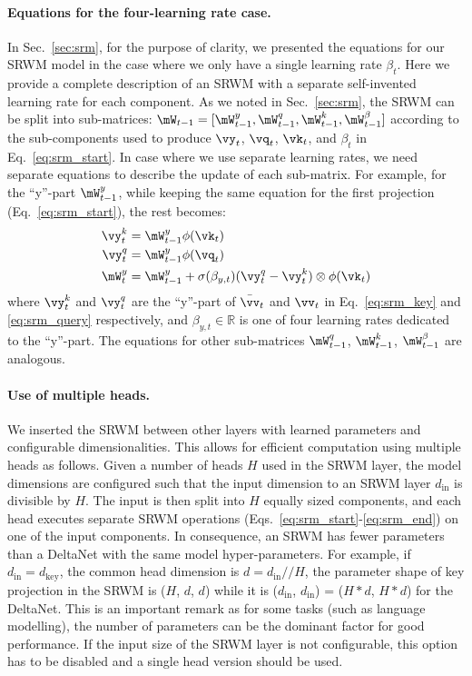 \documentclass[nohyperref]{article}
\theoremstyle{plain}
\theoremstyle{definition}
\theoremstyle{remark}
\begin{document}
\paragraph{Equations for the four-learning rate case.}
In Sec.~\ref{sec:srm}, for the purpose of clarity,
we presented the equations for our SRWM
model in the case where we only have a single learning rate $\beta_t$.
Here we provide a complete description of an SRWM with a separate self-invented learning rate for each component.
As we noted in Sec.~\ref{sec:srm}, the SRWM can be split into sub-matrices: $\mW_{t-1} = [\mW^y_{t-1}, \mW^q_{t-1}, \mW^k_{t-1}, \mW^\beta_{t-1}]$ according to the sub-components used to
produce $\vy_t$, $\vq_t$, $\vk_t$, and $\beta_t$ in Eq.~\ref{eq:srm_start}.
In case where we use separate learning rates, we need
separate equations to describe the update of each sub-matrix.
For example, for the ``y''-part $\mW^y_{t-1}$, while keeping the same equation
for the first projection (Eq.~\ref{eq:srm_start}), the rest becomes:
\begin{align}
\vy^k_t &= \mW^y_{t-1} \phi(\vk_t) \\
\vy^q_t &= \mW^y_{t-1} \phi(\vq_t) \\
\mW^y_{t} &= \mW^y_{t-1} + \sigma(\beta_{y, t})(\vy^q_t - \vy^k_t) \otimes \phi(\vk_t)
\end{align}
where $\vy^k_t$ and $\vy^q_t$ are the ``y''-part of $\bar{\vv}_t$ and $\vv_t$
in Eq.~\ref{eq:srm_key} and \ref{eq:srm_query} respectively,
and $\beta_{y, t} \in \mathbb{R}$ is one of four learning rates
dedicated to the ``y''-part.
The equations for other sub-matrices $\mW^q_{t-1}$, $\mW^k_{t-1}$, $\mW^\beta_{t-1}$
are analogous.

\paragraph{Use of multiple heads.}
We inserted the SRWM between other layers with learned parameters and configurable dimensionalities.
This allows for efficient computation using multiple heads as follows.
Given a number of heads $H$ used in the SRWM layer, the model dimensions are configured such that the input dimension to an SRWM layer $d_\text{in}$ is divisible by $H$.
The input is then split into $H$ equally sized components, and each head executes separate SRWM operations (Eqs.~\ref{eq:srm_start}-\ref{eq:srm_end}) on one of the input components.
In consequence, an SRWM has fewer parameters than a DeltaNet with the same model hyper-parameters.
For example, if $d_\text{in} = d_\text{key}$, the common head dimension is $d = d_\text{in} // H$, the parameter shape of key projection in the SRWM is ($H$, $d$, $d$) while it is ($d_\text{in}$, $d_\text{in}$) = ($H * d$, $H * d$) for the DeltaNet.
This is an important remark as 
for some tasks (such as language modelling),
the number of parameters can be the dominant factor for good performance.
If the input size of the SRWM layer is not configurable, this option has to be disabled and a single head version should be used.
\end{document}
